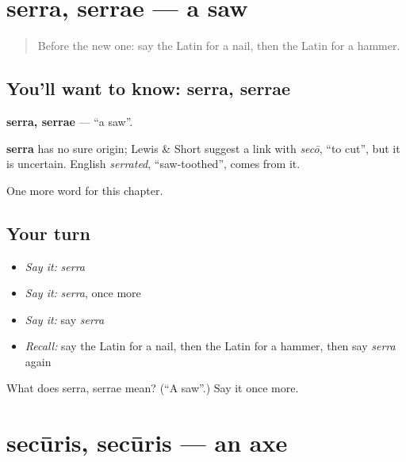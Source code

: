 \section[serra, serrae]{serra, serrae — a saw}

\label{lesson:LA-C122-serra}



\begin{quote}
Before the new one: say the Latin for a nail, then the Latin for a hammer.
\end{quote}

\subsection*{You'll want to know: serra, serrae}
\textbf{serra, serrae} — \textquotedblleft{}a saw\textquotedblright{}.

\begin{cousinweb}
\textbf{serra} has no sure origin; Lewis \& Short suggest a link with \emph{secō}, \textquotedblleft{}to cut\textquotedblright{}, but it is uncertain. English \emph{serrated}, \textquotedblleft{}saw-toothed\textquotedblright{}, comes from it.
\end{cousinweb}

\begin{grammarlens}[title={What you've built}]
One more word for this chapter.
\end{grammarlens}

\subsection*{Your turn}
\begin{itemize}
\raggedright
  \item \emph{Say it:} \emph{serra}
  \item \emph{Say it:} \emph{serra}, once more
  \item \emph{Say it:} say \emph{serra}
  \item \emph{Recall:} say the Latin for a nail, then the Latin for a hammer, then say \emph{serra} again
\end{itemize}

\begin{tcolorbox}[breakable,colback=teal!4,colframe=teal!35!black,title={Before you move on}]
What does serra, serrae mean? (\textquotedblleft{}A saw\textquotedblright{}.) Say it once more.
\end{tcolorbox}
\section[secūris, secūris]{secūris, secūris — an axe}

